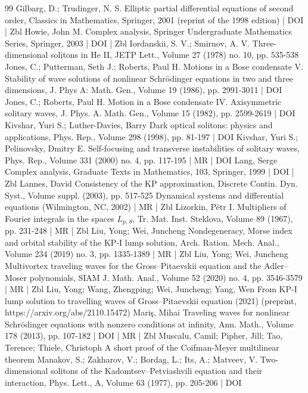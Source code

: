 \documentclass[10pt]{amsart}
\theoremstyle{definition}\newtheorem{defi}[theo]{Definition}\newtheorem{rema}[theo]{Remark}\newtheorem{exam}[theo]{Example}\newtheorem{exem}[theo]{Example}\newtheorem{nota}[theo]{Notation}
\begin{document}
\begin{thebibliography}{99}
Gilbarg, D.; Trudinger, N. S. Elliptic partial differential equations of second order, Classics in Mathematics, Springer, 2001 (reprint of the 1998 edition) | DOI | Zbl
Howie, John M. Complex analysis, Springer Undergraduate Mathematics Series, Springer, 2003 | DOI | Zbl
Iordanskii, S. V.; Smirnov, A. V. Three-dimensional solitons in He II, JETP Lett., Volume 27 (1978) no. 10, pp. 535-538
Jones, C.; Putterman, Seth J.; Roberts, Paul H. Motions in a Bose condensate V. Stability of wave solutions of nonlinear Schrödinger equations in two and three dimensions, J. Phys A: Math. Gen., Volume 19 (1986), pp. 2991-3011 | DOI
Jones, C.; Roberts, Paul H. Motion in a Bose condensate IV. Axisymmetric solitary waves, J. Phys. A. Math. Gen., Volume 15 (1982), pp. 2599-2619 | DOI
Kivshar, Yuri S.; Luther-Davies, Barry Dark optical solitons: physics and applications, Phys. Rep., Volume 298 (1998), pp. 81-197 | DOI
Kivshar, Yuri S.; Pelinovsky, Dmitry E. Self-focusing and transverse instabilities of solitary waves, Phys. Rep., Volume 331 (2000) no. 4, pp. 117-195 | MR | DOI
Lang, Serge Complex analysis, Graduate Texts in Mathematics, 103, Springer, 1999 | DOI | Zbl
Lannes, David Consistency of the KP approximation, Discrete Contin. Dyn. Syst., Volume suppl. (2003), pp. 517-525 Dynamical systems and differential equations (Wilmington, NC, 2002) | MR | Zbl
Lizorkin, Pëtr I. Multipliers of Fourier integrals in the spaces ${L}_{p,\,\theta }$, Tr. Mat. Inst. Steklova, Volume 89 (1967), pp. 231-248 | MR | Zbl
Liu, Yong; Wei, Juncheng Nondegeneracy, Morse index and orbital stability of the KP-I lump solution, Arch. Ration. Mech. Anal., Volume 234 (2019) no. 3, pp. 1335-1389 | MR | Zbl
Liu, Yong; Wei, Juncheng Multivortex traveling waves for the Gross–Pitaevskii equation and the Adler–Moser polynomials, SIAM J. Math. Anal., Volume 52 (2020) no. 4, pp. 3546-3579 | MR | Zbl
Liu, Yong; Wang, Zhengping; Wei, Juncheng; Yang, Wen From KP-I lump solution to travelling waves of Gross–Pitaevskii equation (2021) (preprint, https://arxiv.org/abs/2110.15472)
Mariş, Mihai Traveling waves for nonlinear Schrödinger equations with nonzero conditions at infinity, Ann. Math., Volume 178 (2013), pp. 107-182 | DOI | MR | Zbl
Muscalu, Camil; Pipher, Jill; Tao, Terence; Thiele, Christoph A short proof of the Coifman-Meyer multilinear theorem
Manakov, S.; Zakharov, V.; Bordag, L.; Its, A.; Matveev, V. Two-dimensional solitons of the Kadomtsev–Petviashvili equation and their interaction, Phys. Lett., A, Volume 63 (1977), pp. 205-206 | DOI

\end{thebibliography}
\end{document}
